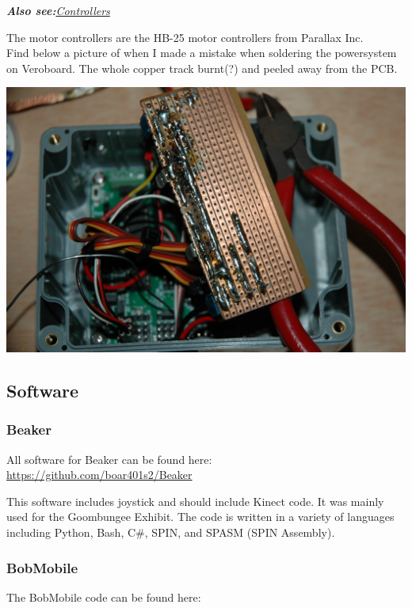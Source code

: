             \textit{\textbf{Also see:}\hyperref[Controllers]{Controllers}}
    		
    		The motor controllers are the HB-25 motor controllers from Parallax Inc.\\
    		
    		Find below a picture of when I made a mistake when soldering the powersystem on Veroboard. The whole copper track burnt(?) and peeled away from the PCB.\\
    		
    		\centerline{\includegraphics[width=0.75\linewidth]{images/PeelyPCB}}
    		
    	\subsection{Software}
    		\subsubsection{Beaker}
    			All software for Beaker can be found here:\\
    			
    			\url{https://github.com/boar401s2/Beaker}
    			
    			This software includes joystick and should include Kinect code. It was mainly used for the Goombungee Exhibit. The code is written in a variety of languages including Python, Bash, C\#, SPIN, and SPASM (SPIN Assembly).\\
    			
    		\subsubsection{BobMobile}
    			The BobMobile code can be found here:\\
    			
